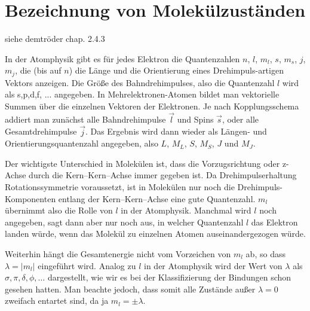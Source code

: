 \section{Bezeichnung von Molekülzuständen}

siehe demtröder chap. 2.4.3

In der Atomphysik gibt es für jedes Elektron die Quantenzahlen $n$, $l$, $m_l$, $s$, $m_s$, $j$, $m_j$, die (bis auf $n$) die Länge und die Orientierung eines Drehimpuls-artigen Vektors anzeigen. Die Größe des Bahndrehimpulses, also die 
Quantenzahl $l$ wird als s,p,d,f, ... angegeben. In Mehrelektronen-Atomen bildet man vektorielle Summen über die einzelnen Vektoren der Elektronen. Je nach Kopplungsschema addiert man zunächst alle Bahndrehimpulse $\vec{l}$ und Spins $\vec{s}$, oder alle Gesamtdrehimpulse $\vec{j}$. Das Ergebnis wird dann wieder als Längen- und Orientierungsquantenzahl angegeben, also $L$, $M_L$, $S$, $M_S$, $J$ und $M_J$.





Der wichtigste Unterschied in Molekülen ist, dass die Vorzugsrichtung oder z-Achse durch die Kern--Kern--Achse immer gegeben ist. Da Drehimpulserhaltung Rotationssymmetrie voraussetzt, ist in Molekülen nur noch die Drehimpuls-Komponenten entlang der Kern--Kern--Achse eine gute Quantenzahl. $m_l$ übernimmt also die Rolle von $l$ in der Atomphysik. Manchmal wird $l$ noch angegeben, sagt dann aber nur noch aus, in welcher Quantenzahl $l$ das Elektron landen würde, wenn das Molekül zu einzelnen Atomen auseinandergezogen würde.

Weiterhin hängt die Gesamtenergie nicht vom Vorzeichen von $m_l$ ab, so dass $\lambda = | m_l | $ eingeführt wird. Analog zu $l$ in der Atomphysik wird der Wert von $\lambda$ als $\sigma, \pi, \delta, \phi, \dots$ dargestellt, wie wir es bei der Klassifizierung der Bindungen schon gesehen hatten. Man beachte jedoch, dass somit alle Zustände außer $\lambda = 0$ zweifach entartet sind, da ja $m_l = \pm \lambda$.


